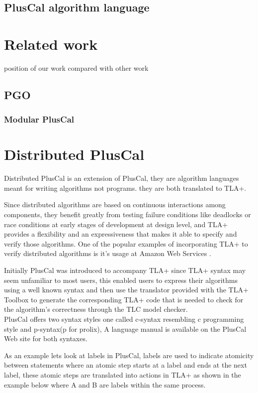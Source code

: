 \documentclass{thesul}
\begin{document}
\section{PlusCal algorithm language}
 

\chapter{Related work}
position of our work compared with other work

\section{PGO}

\subsection{Modular PlusCal}

\chapter{Distributed PlusCal}

Distributed PlusCal is an extension of PlusCal, they are algorithm languages meant for writing algorithms not programs. they are both translated to TLA+. 

Since distributed algorithms are based on continuous interactions among components, they benefit greatly from testing failure conditions like deadlocks or race conditions at early stages of development at design level, and TLA+ provides a flexibility and an expressiveness that makes it able to specify and verify those algorithms. One of the popular examples of incorporating TLA+ to verify distributed algorithms is it's usage at Amazon Web Services \cite{amazon}.

Initially PlusCal was introduced to accompany TLA+ since TLA+ syntax may seem unfamiliar to most users, this enabled users to express their algorithms using a well known syntax and then use the translator provided with the TLA+ Toolbox to generate the corresponding TLA+ code that is needed to check for the algorithm's correctness through the TLC model checker.
\hfill\\
PlusCal offers two syntax styles one called c-syntax resembling c programming style and p-syntax(p for prolix), A language manual is available on the PlusCal Web site for both syntaxes.

As an example lets look at labels in PlusCal, labels are used to indicate atomicity between statements where an atomic step starts at a label and ends at the next label, these atomic steps are translated into actions in TLA+ as shown in the example below where A and B are labels within the same process.
\end{document}
